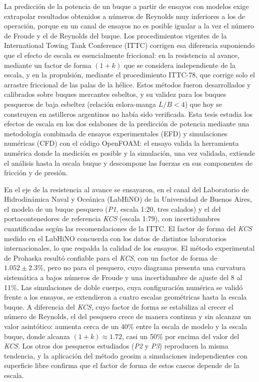\begin{ResumenPlantilla}
La predicción de la potencia de un buque a partir de ensayos con modelos exige
extrapolar resultados obtenidos a números de Reynolds muy inferiores a los de
operación, porque en un canal de ensayos no es posible igualar a la vez el
número de Froude y el de Reynolds del buque. Los procedimientos vigentes de la
International Towing Tank Conference (ITTC) corrigen esa diferencia suponiendo
que el efecto de escala es esencialmente friccional: en la resistencia al
avance, mediante un factor de forma $(1+k)$ que se considera independiente de
la escala, y en la propulsión, mediante el procedimiento ITTC-78, que corrige
solo el arrastre friccional de las palas de la hélice. Estos métodos fueron
desarrollados y calibrados sobre buques mercantes esbeltos, y su validez para
los buques pesqueros de baja esbeltez (relación eslora-manga $L/B < 4$) que hoy
se construyen en astilleros argentinos no había sido verificada. Esta tesis
estudia los efectos de escala en los dos eslabones de la predicción de potencia
mediante una metodología combinada de ensayos experimentales (EFD) y
simulaciones numéricas (CFD) con el código OpenFOAM: el ensayo valida la
herramienta numérica donde la medición es posible y la simulación, una vez
validada, extiende el análisis hasta la escala buque y descompone las fuerzas
en sus componentes de fricción y de presión.

En el eje de la resistencia al avance se ensayaron, en el canal del Laboratorio
de Hidrodinámica Naval y Oceánica (LabHiNO) de la Universidad de Buenos Aires,
el modelo de un buque pesquero (\textit{P1}, escala 1:20, tres calados) y el del
portacontenedores de referencia \textit{KCS} (escala 1:79), con incertidumbres
cuantificadas según las recomendaciones de la ITTC. El factor de forma
del \textit{KCS} medido en el LabHiNO concuerda con los datos de distintos
laboratorios internacionales, lo que respalda la calidad de los ensayos. El método experimental de
Prohaska resultó confiable para el \textit{KCS}, con un factor de forma de
$1.052 \pm 2.3\%$, pero no para el pesquero, cuyo diagrama presenta una
curvatura sistemática a bajos números de Froude y una incertidumbre de ajuste
del 8 al 11\%. Las simulaciones de doble cuerpo, cuya configuración numérica se
validó frente a los ensayos, se extendieron a cuatro escalas geométricas hasta
la escala buque. A diferencia del \textit{KCS}, cuyo factor de forma se
estabiliza al crecer el número de Reynolds, el del pesquero crece de manera
continua y sin alcanzar un valor asintótico: aumenta cerca de un 40\% entre la
escala de modelo y la escala buque, donde alcanza $(1+k) \approx 1.72$, casi un
50\% por encima del valor del \textit{KCS}. Los otros dos pesqueros estudiados
(\textit{P2} y \textit{P3}) reproducen la misma tendencia, y la aplicación del
método geosim a simulaciones independientes con superficie libre confirma que el
factor de forma de estos cascos depende de la escala.


\end{ResumenPlantilla}
